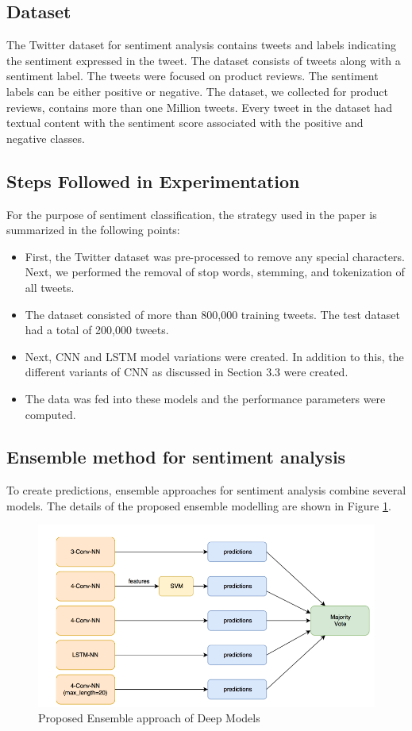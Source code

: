 \subsection{Dataset}
The Twitter dataset for sentiment analysis contains tweets and labels indicating the sentiment expressed in the tweet. The dataset consists of tweets along with a sentiment label. The tweets were focused on product reviews. The sentiment labels can be either positive or negative. The dataset, we collected for product reviews, contains more than one Million tweets. Every tweet in the dataset had textual content with the sentiment score associated with the positive and negative classes.

\subsection{Steps Followed in Experimentation}
For the purpose of sentiment classification, the strategy used in the paper is summarized in the following points:
\begin{itemize}
    \item First, the Twitter dataset was pre-processed to remove any special characters. Next, we performed the removal of stop words, stemming, and tokenization of all tweets. 
    \item The dataset consisted of more than 800,000 training tweets. The test dataset had a total of 200,000 tweets.
    \item Next, CNN and LSTM model variations were created. In addition to this, the different variants of CNN as discussed in Section 3.3 were created. 
    \item The data was fed into these models and the performance parameters were computed.
\end{itemize}


\subsection{Ensemble method for sentiment analysis}
To create predictions, ensemble approaches for sentiment analysis combine several models. The details of the proposed ensemble modelling are shown in Figure \ref{hybrid}.

\begin{figure}
    \centering
    \includegraphics[width=\textwidth]{hybrid.png}
    \caption{Proposed Ensemble approach of Deep Models}
    \label{hybrid}
\end{figure}

